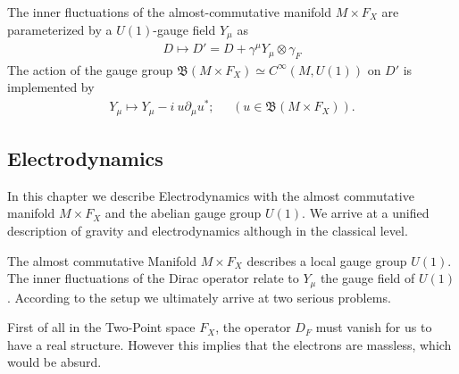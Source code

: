 \begin{proposition}
    The inner fluctuations of the almost-commutative manifold $M\times
    F_X$ are parameterized by a $U(1)$-gauge field $Y_\mu$ as
    \begin{align}
        D \mapsto D' = D + \gamma ^\mu Y_\mu \otimes \gamma_F
    \end{align}
    The action of the gauge group $\mathfrak{B}(M\times F_X) \simeq
    C^\infty (M, U(1))$ on $D'$ is implemented by
    \begin{align}
        Y_\mu \mapsto Y_\mu - i\ u\partial_\mu u^*; \;\;\;\;\; (u\in
        \mathfrak{B}(M\times F_X)).
    \end{align}
\end{proposition}


\subsection{Electrodynamics}
In this chapter we describe Electrodynamics with the almost commutative
manifold $M\times F_X$ and the abelian gauge group $U(1)$.
We arrive at a unified description of gravity and electrodynamics although in the classical level.

The almost commutative Manifold $M\times F_X$ describes a local gauge group
$U(1)$. The inner fluctuations of the Dirac operator relate to $Y_\mu$ the
gauge field of $U(1)$. According to the setup we ultimately arrive at two
serious problems.

First of all in the Two-Point space $F_X$, the operator $D_F$ must vanish for
us to have a real structure. However this implies that the electrons
are massless, which would be absurd.

